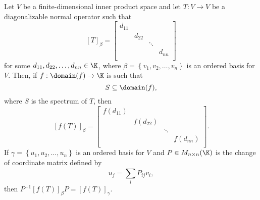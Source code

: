 \documentclass[linearalgebraII]{subfiles}
\begin{document}
    \begin{cor}{}
        Let $V$ be a finite-dimensional inner product space and let $T:V\to V$ be a diagonalizable normal operator such that
        \begin{equation*}
            \left[ T \right] _\beta = 
            \begin{bmatrix}
                d_{11}& & & \\
                & d_{22} & & \\
                & & \ddots& \\
                & & & d_{nn}\\
            \end{bmatrix}
        \end{equation*}
        for some $d_{11}, d_{22}, \ldots, d_{nn}\in\K$, where $\beta = \left\lbrace v_1,v_2,\ldots,v_n \right\rbrace$ is an ordered basis for $V$. Then, if $f:\domain(f)\to\K$ is such that
        \begin{equation*}
            S\subseteq\domain(f),
        \end{equation*}
        where $S$ is the spectrum of $T$, then
        \begin{equation*}
            \left[ f(T) \right] _\beta = 
            \begin{bmatrix}
                f\left( d_{11} \right) & & & \\
                & f\left( d_{22} \right) & & \\
                & & \ddots& \\
                & & & f\left( d_{nn} \right) \\
            \end{bmatrix}.
        \end{equation*}
        If $\gamma = \left\lbrace u_1,u_2,\ldots,u_n \right\rbrace$ is an ordered basis for $V$ and $P\in M_{n\times n}(\K)$ is the change of coordinate matrix defined by
        \begin{equation*}
            u_j = \sum^{}_{i} P_{ij}v_i,
        \end{equation*}
        then $P^{-1}\left[ f(T) \right] _\beta P = \left[ f(T) \right] _\gamma$.
    \end{cor}	
\end{document}
